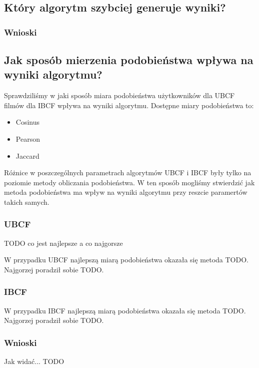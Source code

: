 \documentclass[12pt, a4paper]{article}
\begin{document}
\subsection{Który algorytm szybciej generuje wyniki?}

\subsubsection{Wnioski}

\subsection{Jak sposób mierzenia podobieństwa wpływa na wyniki algorytmu?}
Sprawdziliśmy w jaki sposób miara podobieństwa użytkowników dla UBCF filmów dla IBCF wpływa na wyniki algorytmu.
Dostępne miary podobieństwa to:
\begin{itemize}
\item Cosinus
\item Pearson
\item Jaccard
\end{itemize}

Różnice w poszczególnych parametrach algorytmów UBCF i IBCF były tylko na poziomie metody obliczania podobieństwa. W ten sposób mogliśmy stwierdzić jak metoda podobieństwa ma wpływ na wyniki algorytmu przy reszcie paramertów takich samych. 

\subsubsection{UBCF}
TODO co jest najlepsze a co najgorsze

W przypadku UBCF najlepszą miarą podobieństwa okazała się metoda TODO. Najgorzej poradził sobie TODO.



\subsubsection{IBCF}
W przypadku IBCF najlepszą miarą podobieństwa okazała się metoda TODO. Najgorzej poradził sobie TODO.



\subsubsection{Wnioski}


Jak widać... TODO

\end{document}
